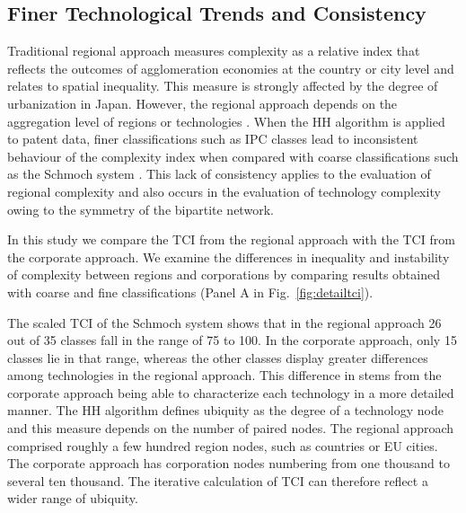 \subsection*{Finer Technological Trends and Consistency}
{}
\label{subsection:consistency}

Traditional regional approach measures complexity as a relative index that reflects the outcomes of agglomeration economies at the country or city level \cite{hartmann2024economic} and relates to spatial inequality. 
This measure is strongly affected by the degree of urbanization in Japan. 
However, the regional approach depends on the aggregation level of regions or technologies \cite{Hidalgo2021}. 
When the HH algorithm is applied to patent data, finer classifications such as IPC classes lead to inconsistent behaviour of the complexity index when compared with coarse classifications such as the Schmoch system \cite{PintarEssletzbichler2022}. 
This lack of consistency applies to the evaluation of regional complexity and also occurs in the evaluation of technology complexity owing to the symmetry of the bipartite network.

In this study we compare the TCI from the regional approach with the TCI from the corporate approach. We examine the differences in inequality and instability of complexity between regions and corporations by comparing results obtained with coarse and fine classifications (Panel A in Fig.~\ref{fig:detailtci}).

The scaled TCI of the Schmoch system shows that in the regional approach 26 out of 35 classes fall in the range of 75 to 100. 
In the corporate approach, only 15 classes lie in that range, whereas the other classes display greater differences among technologies in the regional approach. 
This difference in stems from the corporate approach being able to characterize each technology in a more detailed manner. 
The HH algorithm defines ubiquity as the degree of a technology node and this measure depends on the number of paired nodes. 
The regional approach comprised roughly a few hundred region nodes, such as countries or EU cities\cite{Hidalgo2021,Daniel2020technological}.
The corporate approach has corporation nodes numbering from one thousand to several ten thousand. The iterative calculation of TCI can therefore reflect a wider range of ubiquity.

